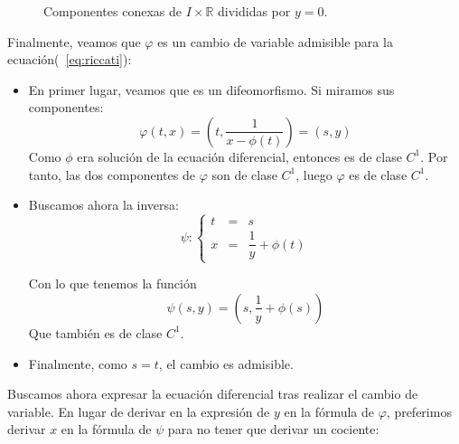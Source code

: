\begin{figure}[H]
\centering
{}
\caption{Componentes conexas de $I\times \mathbb{R}$ divididas por $y=0$.}
\label{fig:riccati_codominios}
\end{figure}
Finalmente, veamos que $\varphi$ es un cambio de variable admisible para la ecuación(~\ref{eq:riccati}):
\begin{itemize}
    \item En primer lugar, veamos que es un difeomorfismo. Si miramos sus componentes:
        \begin{equation*}
            \varphi(t,x) = \left(t,\dfrac{1}{x-\phi(t)}\right) = (s,y)
        \end{equation*}
        Como $\phi$ era solución de la ecuación diferencial, entonces es de clase $C^1$. Por tanto, las dos componentes de $\varphi$ son de clase $C^1$, luego $\varphi$ es de clase $C^1$.
    \item Buscamos ahora la inversa:
        \begin{equation*}
            \psi: \left\{\begin{array}{rcl}
                    t &= &s \\
                    x &= &\dfrac{1}{y}+\phi(t)
            \end{array}\right.
        \end{equation*}

        Con lo que tenemos la función
        \begin{equation*}
            \psi(s,y) = \left(s, \dfrac{1}{y}+\phi(s)\right)
        \end{equation*}
        Que también es de clase $C^1$.
    \item Finalmente, como $s=t$, el cambio es admisible.\\
\end{itemize}
Buscamos ahora expresar la ecuación diferencial tras realizar el cambio de variable. En lugar de derivar en la expresión de $y$ en la fórmula de $\varphi$, preferimos derivar $x$ en la fórmula de $\psi$ para no tener que derivar un cociente:
